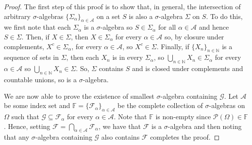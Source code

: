 \documentclass[a4paper,11pt]{article}
\theoremstyle{plain}
\theoremstyle{definition}
\begin{document}
\begin{proof}\citep[p.~4]{SC}
The first step of this proof is to show that, in general, the intersection of arbitrary $\sigma$-algebras $\{\Sigma_\alpha\}_{\alpha \in \mathcal{A}}$ on a set $S$ is also a $\sigma$-algebra $\Sigma$ on $S$. To do this, we first note that each $\Sigma_\alpha$ is a $\sigma$-algebra so $S \in \Sigma_\alpha$ for all $\alpha \in \mathcal{A}$ and hence $S \in \Sigma$. Then, if $X \in \Sigma$, then $X \in \Sigma_\alpha$ for every $\alpha \in \mathcal{A}$ so, by closure under complements, $X^c \in \Sigma_\alpha$, for every $\alpha \in \mathcal{A}$, so $X^c \in \Sigma$. Finally, if $\{X_n\}_{n \in \mathbb{N}}$ is a sequence of sets in $\Sigma$, then each $X_n$ is in every $\Sigma_\alpha$, so $\bigcup_{n \in \mathbb{N}} X_n \in \Sigma_\alpha$ for every $\alpha \in \mathcal{A}$ so $\bigcup_{n \in \mathbb{N}} X_n \in \Sigma$. So, $\Sigma$ contains $S$ and is closed under complements and countable unions, so is a $\sigma$-algebra.

We are now able to prove the existence of smallest $\sigma$-algebra containing $\mathcal{G}$. Let $\mathcal{A}$ be some index set and $\mathbb{F} = \{\mathcal{F}_\alpha\}_{\alpha \in \mathcal{A}}$ be the complete collection of $\sigma$-algebras on $\Omega$ such that $\mathcal{G}\subseteq\mathcal{F}_{\alpha}$ for every $\alpha \in \mathcal{A}$. Note that $\mathbb{F}$ is non-empty since $\mathcal{P}(\Omega) \in \mathbb{F}$. Hence, setting $\mathcal{F} = \bigcap_{\alpha\in\mathcal{A}} \mathcal{F}_{\alpha}$, we have that $\mathcal{F}$ is a $\sigma$-algebra and then noting that any $\sigma$-algebra containing $\mathcal{G}$ also contains $\mathcal{F}$ completes the proof.
\end{proof}

\end{document}

